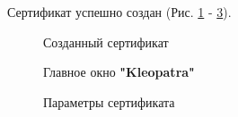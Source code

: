 \documentclass[10pt,a4paper]{report}
\begin{document}
Сертификат успешно создан (Рис. \ref{ris:image2} -  \ref{ris:image4}).
\begin{figure}[h]
\caption{Созданный сертификат}
\label{ris:image2}
\end{figure}
\begin{figure}[h]
\caption{Главное окно \textbf{"Kleopatra"}}
\label{ris:image3}
\end{figure}
\begin{figure}[h]
\caption{Параметры сертификата}
\label{ris:image4}
\end{figure}
\end{document}
